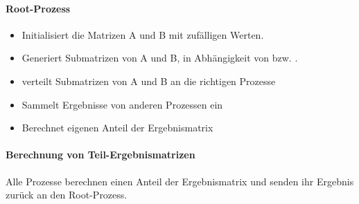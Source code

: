 \paragraph{Root-Prozess}
\begin{itemize}
\item Initialisiert die Matrizen A und B mit zufälligen Werten. 
\item Generiert Submatrizen von A und B, in Abhängigkeit von  bzw. . 
\item verteilt Submatrizen von A und B an die richtigen Prozesse
\item Sammelt Ergebnisse von anderen Prozessen ein
\item Berechnet eigenen Anteil der Ergebnismatrix 
\end{itemize}
\label{lst:a6-init}








\paragraph{Berechnung von Teil-Ergebnismatrizen}
Alle Prozesse berechnen einen Anteil der Ergebnismatrix und senden ihr Ergebnis zurück an den Root-Prozess.
\label{lst:a6-init}





